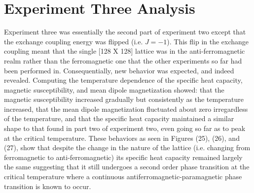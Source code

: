 \documentclass[twocolumn]{article}
\begin{document}
\section{Experiment Three Analysis}
\hspace{\parindent}Experiment three was essentially the second part of experiment two except that the exchange coupling energy was flipped (i.e. $J=-1$). This flip in the exchange coupling meant that the single [128 X 128] lattice was in the anti-ferromagnetic realm rather than the ferromagnetic one that the other experiments so far had been performed in. Consequentially, new behavior was expected, and indeed revealed. Computing the temperature dependence of the specific heat capacity, magnetic susceptibility, and mean dipole magnetization showed: that the magnetic susceptibility increased gradually but consistently as the temperature increased, that the mean dipole magnetization fluctuated about zero irregardless of the temperature, and that the specific heat capacity maintained a similar shape to that found in part two of experiment two, even going so far as to peak at the critical temperature. These behaviors as seen in Figures (25), (26), and (27), show that despite the change in the nature of the lattice (i.e. changing from ferromagnetic to anti-ferromagnetic) its specific heat capacity remained largely the same suggesting that it still undergoes a second order phase transition at the critical temperature where a continuous antiferromagnetic-paramagnetic phase transition is known to occur. \\
\end{document}
